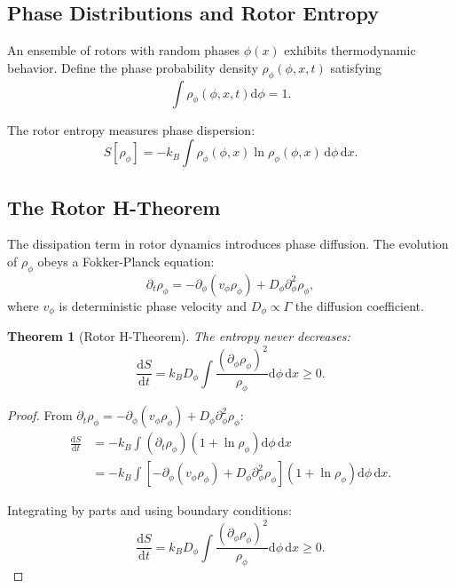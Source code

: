 \documentclass[11pt,a4paper]{article}
\numberwithin{equation}{section}
\theoremstyle{plain}
\newtheorem{theorem}{Theorem}[section]
\theoremstyle{definition}
\theoremstyle{remark}
\newcommand{\dd}{\mathrm{d}}
\begin{document}
\subsection{Phase Distributions and Rotor Entropy}

An ensemble of rotors with random phases $\phi(x)$ exhibits thermodynamic behavior. Define the phase probability density $\rho_\phi(\phi,x,t)$ satisfying
\begin{equation}
\int \rho_\phi(\phi,x,t)\dd\phi = 1.
\end{equation}

The rotor entropy measures phase dispersion:
\begin{equation}
S[\rho_\phi] = -k_B \int \rho_\phi(\phi,x)\ln\rho_\phi(\phi,x)\,\dd\phi\,\dd x.
\label{eq:rotor-entropy}
\end{equation}

\subsection{The Rotor H-Theorem}

The dissipation term in rotor dynamics introduces phase diffusion. The evolution of $\rho_\phi$ obeys a Fokker-Planck equation:
\begin{equation}
\partial_t\rho_\phi = -\partial_\phi(v_\phi\rho_\phi) + D_\phi\partial_\phi^2\rho_\phi,
\end{equation}
where $v_\phi$ is deterministic phase velocity and $D_\phi \propto \Gamma$ the diffusion coefficient.

\begin{theorem}[Rotor H-Theorem]
The entropy never decreases:
\begin{equation}
\boxed{\frac{\dd S}{\dd t} = k_B D_\phi \int \frac{(\partial_\phi\rho_\phi)^2}{\rho_\phi}\dd\phi\,\dd x \geq 0.}
\label{eq:h-theorem}
\end{equation}
\end{theorem}

\begin{proof}
From $\partial_t\rho_\phi = -\partial_\phi(v_\phi\rho_\phi) + D_\phi\partial_\phi^2\rho_\phi$:
\begin{align}
\frac{\dd S}{\dd t} &= -k_B\int (\partial_t\rho_\phi)(1 + \ln\rho_\phi)\dd\phi\,\dd x\\
&= -k_B\int \left[-\partial_\phi(v_\phi\rho_\phi) + D_\phi\partial_\phi^2\rho_\phi\right](1+\ln\rho_\phi)\dd\phi\,\dd x.
\end{align}

Integrating by parts and using boundary conditions:
\begin{equation}
\frac{\dd S}{\dd t} = k_B D_\phi \int \frac{(\partial_\phi\rho_\phi)^2}{\rho_\phi}\dd\phi\,\dd x \geq 0.
\end{equation}
\end{proof}
\end{document}
